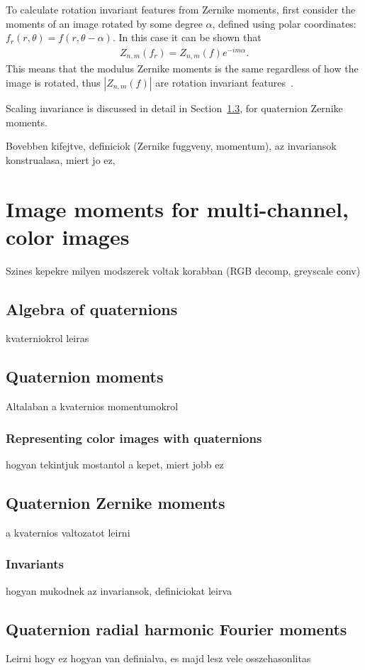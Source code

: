 To calculate rotation invariant features from Zernike moments, first consider the moments of an image rotated by some degree $\alpha$, defined using polar coordinates: $f_{r}(r,\theta) = f(r,\theta - \alpha)$. In this case it can be shown that
\begin{gather*}
    Z_{n,m}(f_r) =  Z_{n,m}(f) e^{-i m\alpha}.
\end{gather*}
This means that the modulus Zernike moments is the same regardless of how the image is rotated, thus $|Z_{n,m}(f)|$ are rotation invariant features~\cite{zernike_moments}.


Scaling invariance is discussed in detail in Section~\ref{sec:qzm}, for quaternion Zernike moments.



Bovebben kifejtve, definiciok (Zernike fuggveny, momentum), az invariansok konstrualasa, miert jo ez,


\section{Image moments for multi-channel, color images}
Szines kepekre milyen modszerek voltak korabban (RGB decomp, greyscale conv)

\subsection{Algebra of quaternions}
kvaterniokrol leiras

\subsection{Quaternion moments}
Altalaban a kvaternios momentumokrol
\subsubsection{Representing color images with quaternions}
hogyan tekintjuk mostantol a kepet, miert jobb ez

\subsection{Quaternion Zernike moments}\label{sec:qzm}
a kvaternios valtozatot leirni
\subsubsection{Invariants}
hogyan mukodnek az invariansok, definiciokat leirva

\subsection{Quaternion radial harmonic Fourier moments}
Leirni hogy ez hogyan van definialva, es majd lesz vele osszehasonlitas


